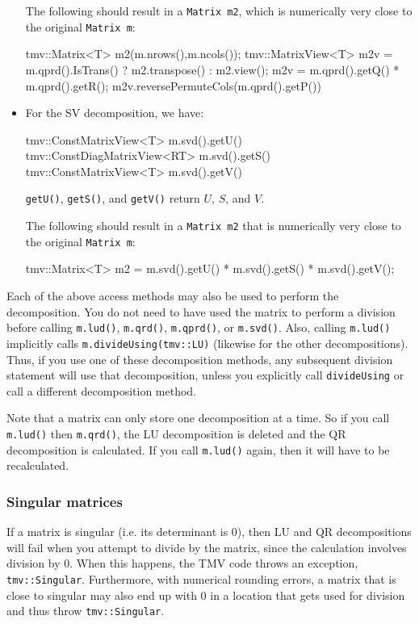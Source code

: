 \documentclass[twoside,letterpaper,11pt]{article}
\renewcommand{\tt}[1]{{\lstinline {#1}}}
\begin{document}
\begin{itemize}
The following should result in a \tt{Matrix m2}, which is numerically very close to
the original \tt{Matrix m}:
\begin{tmvcode}
tmv::Matrix<T> m2(m.nrows(),m.ncols());
tmv::MatrixView<T> m2v = 
      m.qprd().IsTrans() ? m2.transpose() : m2.view();
m2v = m.qprd().getQ() * m.qprd().getR();
m2v.reversePermuteCols(m.qprd().getP())
\end{tmvcode}

\item
For the SV decomposition, we have:
\label{matrixsvd}
\begin{tmvcode}
tmv::ConstMatrixView<T> m.svd().getU()
tmv::ConstDiagMatrixView<RT> m.svd().getS()
tmv::ConstMatrixView<T> m.svd().getV()
\end{tmvcode}
\tt{getU()}, \tt{getS()}, and \tt{getV()} return $U$, $S$, and $V$.

The following should result in a \tt{Matrix m2}
that is numerically very close to the original \tt{Matrix m}:
\begin{tmvcode}
tmv::Matrix<T> m2 = m.svd().getU() * m.svd().getS() * m.svd().getV();
\end{tmvcode}
\end{itemize}

Each of the above access methods may also be used to perform the decomposition.
You do not need to have used the matrix to perform a division before
calling \tt{m.lud()}, \tt{m.qrd()}, \tt{m.qprd()}, or \tt{m.svd()}.  Also, calling
\tt{m.lud()} implicitly calls \tt{m.divideUsing(tmv::LU)} (likewise for the other 
decompositions).  Thus, if you use one of these decomposition methods, any
subsequent division statement will use that decomposition, unless you explicitly
call \tt{divideUsing} or call a different decomposition method.

Note that a matrix can only store one decomposition at a time.  So if you 
call \tt{m.lud()} then \tt{m.qrd()}, the LU decomposition is deleted
and the QR decomposition is calculated.  If you call \tt{m.lud()} again, then 
it will have to be recalculated.

\subsubsection{Singular matrices}
\label{singular}

If a matrix is singular (i.e. its determinant is 0), 
then LU and QR decompositions
will fail when you attempt to divide by the matrix, since the 
calculation involves division by 0.  When this happens, the TMV code
throws an exception,
\tt{tmv::Singular}. 
Furthermore, with numerical rounding errors, a matrix
that is close to singular may also end up with 0 in a location that gets
used for division and thus throw \tt{tmv::Singular}.
\end{document}
